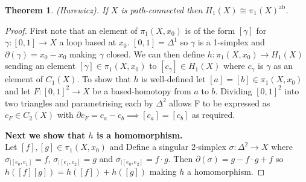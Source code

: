 \documentclass{report}
\newtheorem{theorem}{Theorem}
\begin{document}
\begin{theorem}
(Hurewicz). If $X$ is path-connected then $H_1(X)\cong\pi_1(X)^{\text{ab}}$.
\end{theorem}
\begin{proof}
First note that an element of $\pi_1(X,x_0)$ is of the form $[\gamma]$ for $\gamma\colon [0,1]\to X$ a loop based at $x_0$. $[0,1]=\Delta^1$ so $\gamma$ is a 1-simplex and $\partial(\gamma)=x_0-x_0$ making $\gamma$ closed.
We can then define $h\colon\pi_1(X,x_0)\to H_1(X)$ sending an element $[\gamma]\in\pi_1(X,x_0)$ to $[c_\gamma]\in H_1(X)$ where $c_\gamma$ is $\gamma$ as an element of $C_1(X)$. To show that $h$ is well-defined let $[a]=[b]\in\pi_1(X,x_0)$ and let $F\colon [0,1]^2\to X$ be a based-homotopy from $a$ to $b$. Dividing $[0,1]^2$ into two triangles and parametrising each by $\Delta^2$ allows F to be expressed as $c_F\in C_2(X)$ with $\partial c_F=c_a-c_b\implies [c_a]=[c_b]$ as required.

\noindent \textbf{Next we show that $h$ is a homomorphism.}\\
Let $[f],[g]\in\pi_1(X,x_0)$ and Define a singular 2-simplex $\sigma\colon\Delta^2\to X$ where $\sigma_{|[e_0,e_1]}=f$, $\sigma_{|[e_1,e_2]}=g$ and $\sigma_{|[e_0,e_2]}=f\cdot g$. Then $\partial(\sigma)=g-f\cdot g+f$ so $h([f][g])=h([f])+h([g])$ making $h$ a homomorphism.


\end{proof}
\end{document}
